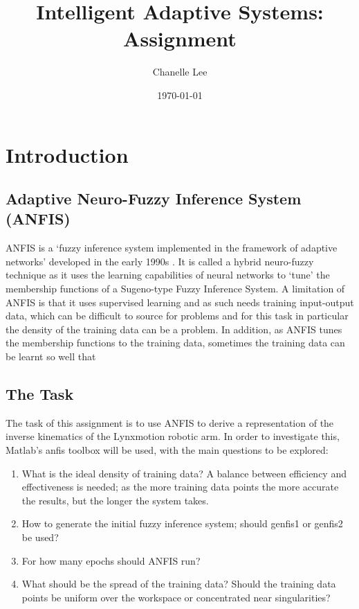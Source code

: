 \documentclass[11.5pt, twoside, a4paper]{article}
\begin{document}
\title{Intelligent Adaptive Systems: Assignment}
\author{Chanelle Lee}
\date{\today}
\maketitle

\section{Introduction}

\subsection{Adaptive Neuro-Fuzzy Inference System (ANFIS)} %
ANFIS is a `fuzzy inference system implemented in the framework of adaptive networks' developed in the early 1990s \cite{JangANFIS}. It is called a hybrid neuro-fuzzy technique as it uses the learning capabilities of neural networks to `tune' the membership functions of a Sugeno-type Fuzzy Inference System. A limitation of ANFIS is that it uses supervised learning and as such needs training input-output data, which can be difficult to source for problems and for this task in particular the density of the training data can be a problem. In addition, as ANFIS tunes the membership functions to the training data, sometimes the training data can be learnt so well that 

\subsection{The Task}
The task of this assignment is to use ANFIS to derive a representation of the inverse kinematics of the Lynxmotion robotic arm. In order to investigate this, Matlab's anfis toolbox will be used, with the main questions to be explored:
\begin{enumerate}
\item What is the ideal density of training data? A balance between efficiency and effectiveness is needed; as the more training data points the more accurate the results, but the longer the system takes.
\item How to generate the initial fuzzy inference system; should genfis1 or genfis2 be used? 
\item For how many epochs should ANFIS run?
\item What should be the spread of the training data? Should the training data points be uniform over the workspace or concentrated near singularities?
\end{enumerate}
\end{document}
